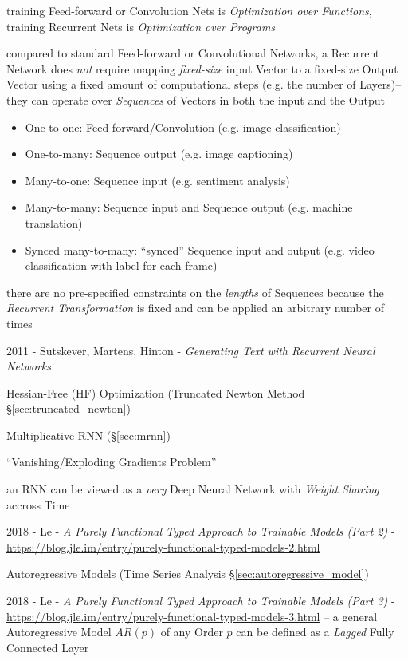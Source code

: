 training Feed-forward or Convolution Nets is \emph{Optimization over
  Functions}, training Recurrent Nets is \emph{Optimization over Programs}

compared to standard Feed-forward or Convolutional Networks, a Recurrent Network
does \emph{not} require mapping \emph{fixed-size} input Vector to a fixed-size
Output Vector using a fixed amount of computational steps (e.g. the number of
Layers)-- they can operate over \emph{Sequences} of Vectors in both the input
and the Output
\begin{itemize}
  \item One-to-one: Feed-forward/Convolution (e.g. image classification)
  \item One-to-many: Sequence output (e.g. image captioning)
  \item Many-to-one: Sequence input (e.g. sentiment analysis)
  \item Many-to-many: Sequence input and Sequence output (e.g. machine
    translation)
  \item Synced many-to-many: ``synced'' Sequence input and output (e.g. video
    classification with label for each frame)
\end{itemize}
there are no pre-specified constraints on the \emph{lengths} of Sequences
because the \emph{Recurrent Transformation} is fixed and can be applied an
arbitrary number of times

\asterism

2011 - Sutskever, Martens, Hinton -
  \emph{Generating Text with Recurrent Neural Networks}

Hessian-Free (HF) Optimization (Truncated Newton Method
\S\ref{sec:truncated_newton})

Multiplicative RNN (\S\ref{sec:mrnn})

``Vanishing/Exploding Gradients Problem''

an RNN can be viewed as a \emph{very} Deep Neural Network with \emph{Weight
  Sharing} accross Time

\asterism

2018 - Le -
\emph{A Purely Functional Typed Approach to Trainable Models (Part 2)} -
\url{https://blog.jle.im/entry/purely-functional-typed-models-2.html}

\fist Autoregressive Models (Time Series Analysis
\S\ref{sec:autoregressive_model})

2018 - Le -
\emph{A Purely Functional Typed Approach to Trainable Models (Part 3)} -
\url{https://blog.jle.im/entry/purely-functional-typed-models-3.html}
-- a general Autoregressive Model $AR(p)$ of any Order $p$ can be defined as a
\emph{Lagged} Fully Connected Layer



